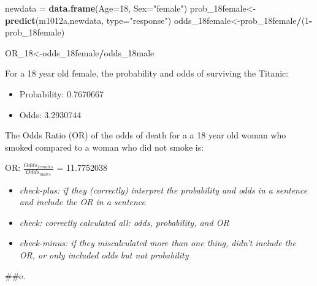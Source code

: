 \documentclass[]{article}
\newenvironment{Shaded}{\begin{snugshade}}{\end{snugshade}}
\newcommand{\DataTypeTok}[1]{\textcolor[rgb]{0.13,0.29,0.53}{#1}}
\newcommand{\DecValTok}[1]{\textcolor[rgb]{0.00,0.00,0.81}{#1}}
\newcommand{\KeywordTok}[1]{\textcolor[rgb]{0.13,0.29,0.53}{\textbf{#1}}}
\newcommand{\NormalTok}[1]{#1}
\newcommand{\OperatorTok}[1]{\textcolor[rgb]{0.81,0.36,0.00}{\textbf{#1}}}
\newcommand{\StringTok}[1]{\textcolor[rgb]{0.31,0.60,0.02}{#1}}
\providecommand{\tightlist}{%
  \setlength{\itemsep}{0pt}\setlength{\parskip}{0pt}}
\begin{document}
\begin{Shaded}
\begin{Highlighting}[]
\NormalTok{newdata =}\StringTok{ }\KeywordTok{data.frame}\NormalTok{(}\DataTypeTok{Age=}\DecValTok{18}\NormalTok{, }\DataTypeTok{Sex=}\StringTok{"female"}\NormalTok{)}
\NormalTok{prob_18female<-}\KeywordTok{predict}\NormalTok{(m1012a,newdata, }\DataTypeTok{type=}\StringTok{"response"}\NormalTok{)}
\NormalTok{odds_18female<-prob_18female}\OperatorTok{/}\NormalTok{(}\DecValTok{1}\OperatorTok{-}\NormalTok{prob_18female)}

\NormalTok{OR_}\DecValTok{18}\NormalTok{<-odds_18female}\OperatorTok{/}\NormalTok{odds_18male}
\end{Highlighting}
\end{Shaded}

For a 18 year old female, the probability and odds of surviving the
Titanic:

\begin{itemize}
\tightlist
\item
  Probability: 0.7670667
\item
  Odds: 3.2930744
\end{itemize}

The Odds Ratio (OR) of the odds of death for a a 18 year old woman who
smoked compared to a woman who did not smoke is:

OR: \(\frac{Odds_{females}}{Odds_{males}}\) = 11.7752038

\begin{itemize}
\tightlist
\item
  \emph{check-plus: if they (correctly) interpret the probability and
  odds in a sentence \emph{and} include the OR in a sentence}
\item
  \emph{check: correctly calculated all: odds, probability, and OR}
\item
  \emph{check-minus: if they miscalculated more than one thing, didn't
  include the OR, or only included odds but not probability}
\end{itemize}

\#\#e.
\end{document}
